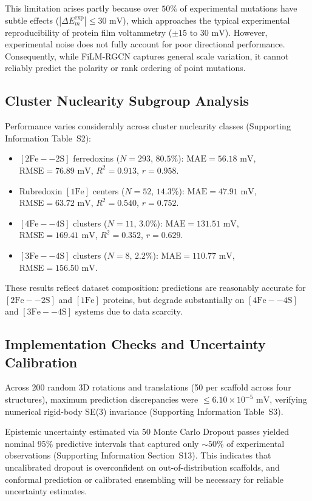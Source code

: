 \documentclass[journal=jcisd8,manuscript=article]{achemso}
\begin{document}
This limitation arises partly because over $50\%$ of experimental mutations have subtle effects ($|\Delta E_m^{\text{exp}}| \le 30\text{ mV}$), which approaches the typical experimental reproducibility of protein film voltammetry ($\pm 15\text{ to } 30\text{ mV}$).\cite{armstrong1997reactions,armstrong2018protein} However, experimental noise does not fully account for poor directional performance. Consequently, while FiLM-RGCN captures general scale variation, it cannot reliably predict the polarity or rank ordering of point mutations.

\subsection{Cluster Nuclearity Subgroup Analysis}
Performance varies considerably across cluster nuclearity classes (Supporting Information Table~S2):
\begin{itemize}
    \item $[2\text{Fe}--2\text{S}]$ ferredoxins ($N=293$, $80.5\%$): $\text{MAE} = 56.18\text{ mV}$, $\text{RMSE} = 76.89\text{ mV}$, $R^2 = 0.913$, $r = 0.958$.
    \item Rubredoxin $[1\text{Fe}]$ centers ($N=52$, $14.3\%$): $\text{MAE} = 47.91\text{ mV}$, $\text{RMSE} = 63.72\text{ mV}$, $R^2 = 0.540$, $r = 0.752$.
    \item $[4\text{Fe}--4\text{S}]$ clusters ($N=11$, $3.0\%$): $\text{MAE} = 131.51\text{ mV}$, $\text{RMSE} = 169.41\text{ mV}$, $R^2 = 0.352$, $r = 0.629$.
    \item $[3\text{Fe}--4\text{S}]$ clusters ($N=8$, $2.2\%$): $\text{MAE} = 110.77\text{ mV}$, $\text{RMSE} = 156.50\text{ mV}$.
\end{itemize}
These results reflect dataset composition: predictions are reasonably accurate for $[2\text{Fe}--2\text{S}]$ and $[1\text{Fe}]$ proteins, but degrade substantially on $[4\text{Fe}--4\text{S}]$ and $[3\text{Fe}--4\text{S}]$ systems due to data scarcity.

\subsection{Implementation Checks and Uncertainty Calibration}
Across 200 random 3D rotations and translations (50 per scaffold across four structures), maximum prediction discrepancies were $\le 6.10 \times 10^{-5}\text{ mV}$, verifying numerical rigid-body SE(3) invariance (Supporting Information Table~S3). 

Epistemic uncertainty estimated via 50 Monte Carlo Dropout passes yielded nominal 95\% predictive intervals that captured only $\sim 50\%$ of experimental observations (Supporting Information Section~S13). This indicates that uncalibrated dropout is overconfident on out-of-distribution scaffolds, and conformal prediction or calibrated ensembling will be necessary for reliable uncertainty estimates.
\end{document}
